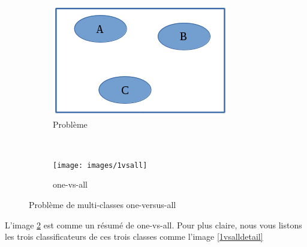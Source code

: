 \begin{figure}[H]
        \centering
        \begin{subfigure}[b]{0.5\textwidth}
                \includegraphics[width=\textwidth]{images/multiclass}
                \caption{Problème}
                \label{mclass}
        \end{subfigure}%
        ~ %
        \begin{subfigure}[b]{0.5\textwidth}
                \texttt{[image: images/1vsall]}
                \caption{one-vs-all}
                \label{1vsall}
        \end{subfigure}
        \caption{Problème de multi-classes one-versus-all}\label{mulclass}
\end{figure}


L'image \ref{1vsall} est comme un résumé de one-vs-all. Pour plus claire, nous vous listons les trois classificateurs de ces trois classes comme l'image \ref{1vsalldetail}

